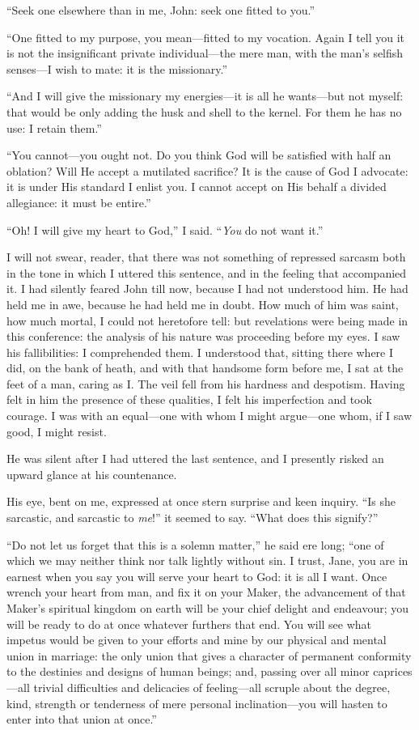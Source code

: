 \enquote{Seek one elsewhere than in me, \St{} John: seek one fitted to
you.}

\enquote{One fitted to my purpose, you mean---fitted to my vocation. 
Again I tell you it is not the insignificant private individual---the
mere man, with the man's selfish senses---I wish to mate: it is the
missionary.}

\enquote{And I will give the missionary my energies---it is all he
wants---but not myself: that would be only adding the husk and shell to
the kernel. For them he has no use: I retain them.}

\enquote{You cannot---you ought not. Do you think God will be satisfied
with half an oblation? Will He accept a mutilated sacrifice? It is the
cause of God I advocate: it is under His standard I enlist you. I
cannot accept on His behalf a divided allegiance: it must be entire.}

\enquote{Oh! I will give my heart to God,} I said. \enquote{\emph{You} do not
want it.}

I will not swear, reader, that there was not something of repressed
sarcasm both in the tone in which I uttered this sentence, and in the
feeling that accompanied it. I had silently feared \St{} John till now,
because I had not understood him. He had held me in awe, because he had
held me in doubt. How much of him was saint, how much mortal, I could
not heretofore tell: but revelations were being made in this conference:
the analysis of his nature was proceeding before my eyes. I saw his
fallibilities: I comprehended them. I understood that, sitting there
where I did, on the bank of heath, and with that handsome form before
me, I sat at the feet of a man, caring as I\@. The veil fell from his
hardness and despotism. Having felt in him the presence of these
qualities, I felt his imperfection and took courage. I was with an
equal---one with whom I might argue---one whom, if I saw good, I might
resist.

He was silent after I had uttered the last sentence, and I presently
risked an upward glance at his countenance.

His eye, bent on me, expressed at once stern surprise and keen inquiry. 
\enquote{Is she sarcastic, and sarcastic to \emph{me}!} it seemed to say. 
\enquote{What does this signify?}

\enquote{Do not let us forget that this is a solemn matter,} he said ere
long; \enquote{one of which we may neither think nor talk lightly
without sin. I trust, Jane, you are in earnest when you say you will
serve your heart to God: it is all I want. Once wrench your heart from
man, and fix it on your Maker, the advancement of that Maker's spiritual
kingdom on earth will be your chief delight and endeavour; you will be
ready to do at once whatever furthers that end. You will see what
impetus would be given to your efforts and mine by our physical and
mental union in marriage: the only union that gives a character of
permanent conformity to the destinies and designs of human beings; and,
passing over all minor caprices---all trivial difficulties and
delicacies of feeling---all scruple about the degree, kind, strength or
tenderness of mere personal inclination---you will hasten to enter into
that union at once.}

